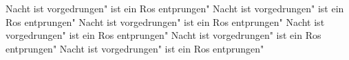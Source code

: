 \ifx\mxversion\undefined
  
  
  
  
\fi

%
\tableofcontents
\normalmusicsize
 Nacht ist vorgedrungen"
 ist ein Ros entprungen"
 Nacht ist vorgedrungen"
 ist ein Ros entprungen"
 Nacht ist vorgedrungen"
 ist ein Ros entprungen"
 Nacht ist vorgedrungen"
 ist ein Ros entprungen"
 Nacht ist vorgedrungen"
 ist ein Ros entprungen"
 Nacht ist vorgedrungen"
 ist ein Ros entprungen"

\bookbye